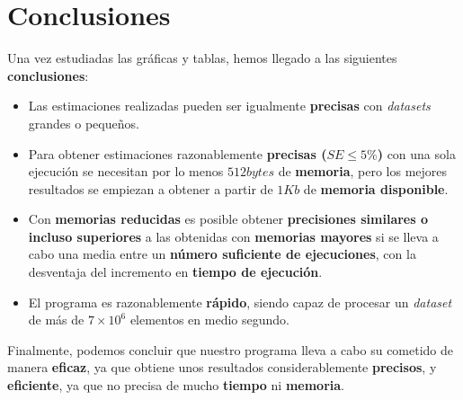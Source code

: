 % 
\section{Conclusiones}
\label{conclusiones}

Una vez estudiadas las gráficas y tablas, hemos llegado a las siguientes \textbf{conclusiones}:


\begin{itemize}
	\item Las estimaciones realizadas pueden ser igualmente \textbf{precisas} con \emph{datasets} grandes o pequeños.
	
	\item Para obtener estimaciones razonablemente \textbf{precisas ($SE\leq5\%$)} con una sola ejecución se necesitan por lo menos $512 bytes$ de \textbf{memoria}, pero los mejores resultados se empiezan a obtener a partir de $1 Kb$ de \textbf{memoria disponible}.
	
	\item Con \textbf{memorias reducidas} es posible obtener \textbf{precisiones similares o incluso superiores} a las obtenidas con \textbf{memorias mayores} si se lleva a cabo una media entre un \textbf{número suficiente de ejecuciones}, con la desventaja del incremento en \textbf{tiempo de ejecución}.

	\item El programa es razonablemente \textbf{rápido}, siendo capaz de procesar un \emph{dataset} de más de $7\times10^6$ elementos en medio segundo.
\end{itemize}

Finalmente, podemos concluir que nuestro programa lleva a cabo su cometido de manera \textbf{eficaz}, ya que obtiene unos resultados considerablemente \textbf{precisos}, y \textbf{eficiente}, ya que no precisa de mucho \textbf{tiempo} ni \textbf{memoria}.